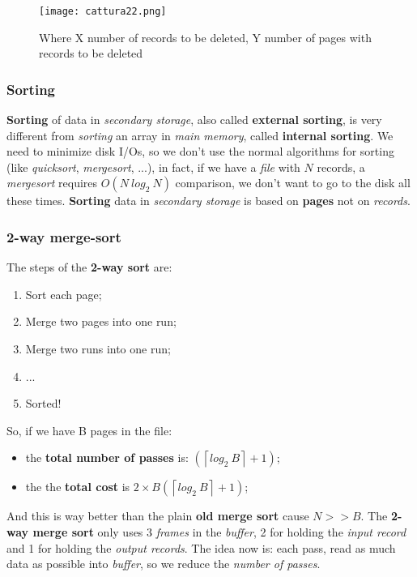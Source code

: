 \documentclass{article}
\begin{document}
\begin{figure}[H]
  \centering
  \texttt{[image: cattura22.png]}
  \caption{Where X number of records to be deleted, Y number of pages with records to be deleted}
\end{figure}
\subsubsection{Sorting}
\textbf{Sorting} of data in \emph{secondary storage}, also called \textbf{external sorting}, is very different from \emph{sorting} an array in \emph{main memory}, called \textbf{internal sorting}. We need to minimize disk I/Os, so we don't use the normal algorithms for sorting (like \emph{quicksort}, \emph{mergesort}, ...), in fact, if we have a \emph{file} with $N$ records, a \emph{mergesort} requires $O(N\ log_2\ N)$ comparison, we don't want to go to the disk all these times. \textbf{Sorting} data in \emph{secondary storage} is based on \textbf{pages} not on \emph{records}. 
\subsubsection{2-way merge-sort}
The steps of the\textbf{ 2-way sort} are:
\begin{enumerate}
\item Sort each page;
\item Merge two pages into one run;
\item Merge two runs into one run;
\item ...
\item Sorted!
\end{enumerate}
So, if we have B pages in the file:
\begin{itemize}
\item the \textbf{total number of passes} is: $(\left \lceil  log_2\ B\right \rceil +1)$;
\item the the\textbf{ total cost} is $2 \times B(\left \lceil  log_2\ B\right \rceil +1)$;
\end{itemize}
And this is way better than the plain \textbf{old merge sort} cause $N >> B$. The\textbf{ 2-way merge sort} only uses 3 \emph{frames} in the \emph{buffer}, 2 for holding the \emph{input record} and 1 for holding the \emph{output records}. The idea now is: each pass, read as much data as possible into \emph{buffer}, so we reduce the \emph{number of passes}. 
\end{document}
